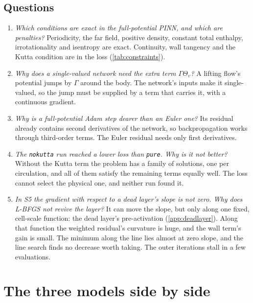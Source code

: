 \subsection*{Questions}
\begin{enumerate}[label=Q\arabic*., leftmargin=*]
\item \textit{Which conditions are exact in the full-potential PINN, and which are penalties?}\newline
Periodicity, the far field, positive density, constant total enthalpy, irrotationality and
isentropy are exact. Continuity, wall tangency and the Kutta condition are in the loss
(\cref{tab:constraints}).
\item \textit{Why does a single-valued network need the extra term $\Gamma\Theta_v$?}\newline
A lifting flow's potential jumps by $\Gamma$ around the body. The network's inputs make it
single-valued, so the jump must be supplied by a term that carries it, with a continuous gradient.
\item \textit{Why is a full-potential Adam step dearer than an Euler one?}\newline
Its residual already contains second derivatives of the network, so backpropagation works through
third-order terms. The Euler residual needs only first derivatives.
\item \textit{The \texttt{nokutta} run reached a lower loss than \texttt{pure}. Why is it not better?}\newline
Without the Kutta term the problem has a family of solutions, one per circulation, and all of them
satisfy the remaining terms equally well. The loss cannot select the physical one, and neither run
found it.
\item \textit{In S5 the gradient with respect to a dead layer's slope is not zero. Why does
L-BFGS not revive the layer?}\newline
It can move the slope, but only along one fixed, cell-scale function: the dead layer's
pre-activation (\cref{app:deadlayer}). Along that function the weighted residual's curvature is
huge, and the wall term's gain is small. The minimum along the line lies almost at zero slope, and
the line search finds no decrease worth taking. The outer iterations stall in a few evaluations.
\end{enumerate}

\section{The three models side by side}
\label{app:compare}

